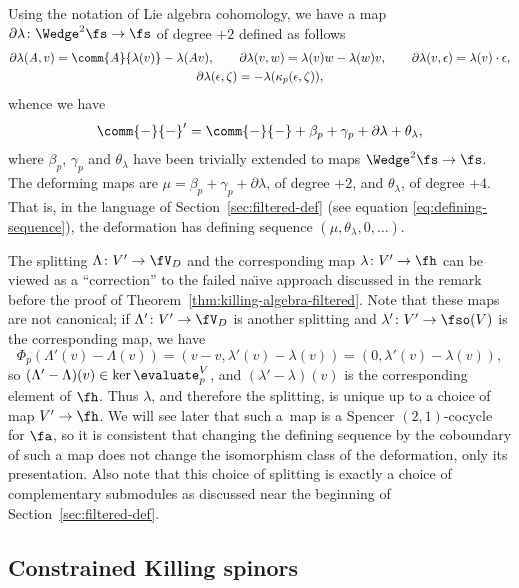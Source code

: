 Using the notation of Lie algebra cohomology, we have a map $\partial\lambda\colon\Wedge^2\fs\to\fs$ of degree $+2$ defined as follows
\begin{gather*}
	\partial\lambda(A,v) = \comm{A}{\lambda(v)}-\lambda(Av),\qquad
	 \partial\lambda(v,w) = \lambda(v)w-\lambda(w)v,\qquad
	\partial\lambda(v,\epsilon)	= \lambda(v)\cdot\epsilon,\\
	 \partial\lambda(\epsilon,\zeta)	= -\lambda(\kappa_p(\epsilon,\zeta)),
\end{gather*}
whence we have
\[
	\comm{-}{-}' = \comm{-}{-} + \beta_p + \gamma_p + \partial\lambda + \theta_\lambda,
\]
where $\beta_p$, $\gamma_p$ and $\theta_\lambda$ have been trivially extended to maps $\Wedge^2\fs\to\fs$. The deforming maps are $\mu = \beta_p + \gamma_p+\partial\lambda$, of degree $+2$, and $\theta_\lambda$, of degree $+4$. That is, in the language of Section~\ref{sec:filtered-def} (see equation \eqref{eq:defining-sequence}), the deformation has defining sequence $(\mu,\theta_\lambda,0,\dots)$.

The splitting $\Lambda\colon V'\to \fV_D$ and the corresponding map $\lambda \colon V'\to\fh$ can be viewed as a ``correction'' to the failed na\"{\i}ve approach discussed in the remark before the proof of Theorem~\ref{thm:killing-algebra-filtered}. Note that these maps are not canonical; if $\Lambda'\colon V'\to\fV_D$ is another splitting and $\lambda'\colon V'\to\fso(V)$ is the corresponding map, we have
\[
	\Phi_p(\Lambda'(v)-\Lambda(v)) = (v-v,\lambda'(v)-\lambda(v)) = (0,\lambda'(v)-\lambda(v)),
\]
so $(\Lambda'-\Lambda)(v)\in\ker\evaluate^V_p$, and $(\lambda'-\lambda)(v)$ is the corresponding element of $\fh$. Thus $\lambda$, and therefore the splitting, is unique up to a choice of map $V'\to\fh$. We will see later that such a~map is a Spencer $(2,1)$-cocycle for $\fa$, so it is consistent that changing the defining sequence by the coboundary of such a map does not change the isomorphism class of the deformation, only its presentation. Also note that this choice of splitting is exactly a choice of complementary submodules as discussed near the beginning of Section~\ref{sec:filtered-def}.

\subsection{Constrained Killing spinors}
\label{sec:alg-kse}


